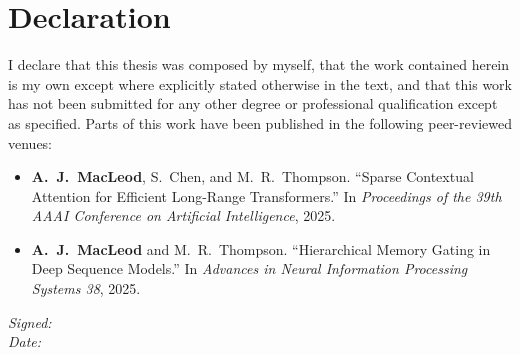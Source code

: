 \chapter*{Declaration}
\thispagestyle{plain}
\vspace*{10mm}

I declare that this thesis was composed by myself, that the work contained herein is my own
except where explicitly stated otherwise in the text, and that this work has not been submitted
for any other degree or professional qualification except as specified. Parts of this work have
been published in the following peer-reviewed venues:

\begin{itemize}
  \item \textbf{A.\ J.\ MacLeod}, S.\ Chen, and M.\ R.\ Thompson. ``Sparse Contextual Attention
    for Efficient Long-Range Transformers.'' In \textit{Proceedings of the 39th AAAI Conference
    on Artificial Intelligence}, 2025.
  \item \textbf{A.\ J.\ MacLeod} and M.\ R.\ Thompson. ``Hierarchical Memory Gating in Deep
    Sequence Models.'' In \textit{Advances in Neural Information Processing Systems 38}, 2025.
\end{itemize}

\vspace{20mm}
\noindent\textit{Signed:} \hrulefill\\[4mm]
\noindent\textit{Date:} \hrulefill

\cleardoublepage

